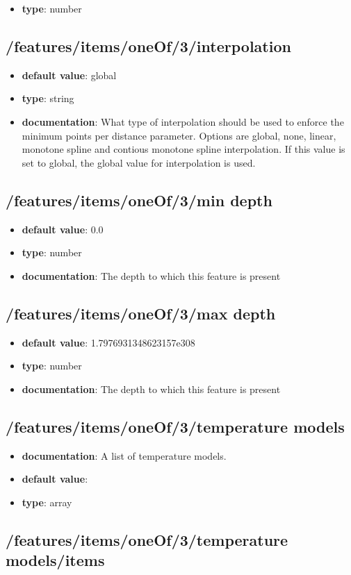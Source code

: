\begin{itemize}\item {\bf type}: number
\end{itemize}\subsection{/features/items/oneOf/3/interpolation}
\begin{itemize}\item {\bf default value}: global
\item {\bf type}: string
\item {\bf documentation}: What type of interpolation should be used to enforce the minimum points per distance parameter. Options are global, none, linear, monotone spline and contious monotone spline interpolation. If this value is set to global, the global value for interpolation is used.
\end{itemize}\subsection{/features/items/oneOf/3/min depth}
\begin{itemize}\item {\bf default value}: 0.0
\item {\bf type}: number
\item {\bf documentation}: The depth to which this feature is present
\end{itemize}\subsection{/features/items/oneOf/3/max depth}
\begin{itemize}\item {\bf default value}: 1.7976931348623157e308
\item {\bf type}: number
\item {\bf documentation}: The depth to which this feature is present
\end{itemize}\subsection{/features/items/oneOf/3/temperature models}
\begin{itemize}\item {\bf documentation}: A list of temperature models.
\item {\bf default value}: 
\item {\bf type}: array
\end{itemize}\subsection{/features/items/oneOf/3/temperature models/items}

